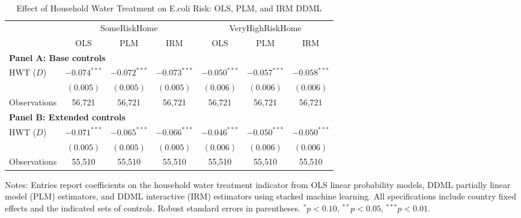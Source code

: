 

\begin{table}[htbp]\centering
\caption{Effect of Household Water Treatment on E.coli Risk: OLS, PLM, and IRM DDML}
\label{tab:benchmark_main}
\begin{tabular}{lcccccc}
\toprule \toprule
& \multicolumn{3}{c}{SomeRiskHome} & \multicolumn{3}{c}{VeryHighRiskHome} \\
\cmidrule(lr){2-4} \cmidrule(lr){5-7}
& OLS & PLM & IRM & OLS & PLM & IRM \\
\midrule
\multicolumn{7}{l}{\textbf{Panel A: Base controls}} \\
\midrule
HWT ($D$) &
$-0.074^{***}$ & $-0.072^{***}$ & $-0.073^{***}$ &
$-0.050^{***}$ & $-0.057^{***}$ & $-0.058^{***}$ \\
& $(0.005)$ & $(0.005)$ & $(0.005)$ & $(0.006)$ & $(0.006)$ & $(0.006)$ \\
Observations &
56{,}721 & 56{,}721 & 56{,}721 & 56{,}721 & 56{,}721 & 56{,}721 \\
\midrule
\multicolumn{7}{l}{\textbf{Panel B: Extended controls}} \\
\midrule
HWT ($D$) &
$-0.071^{***}$ & $-0.065^{***}$ & $-0.066^{***}$ &
$-0.046^{***}$ & $-0.050^{***}$ & $-0.050^{***}$ \\
& $(0.005)$ & $(0.005)$ & $(0.005)$ & $(0.006)$ & $(0.006)$ & $(0.006)$ \\
Observations &
55{,}510 & 55{,}510 & 55{,}510 & 55{,}510 & 55{,}510 & 55{,}510 \\
\bottomrule \bottomrule
\end{tabular}
\begin{flushleft}
\footnotesize
Notes: Entries report coefficients on the household water treatment indicator from OLS linear probability models, DDML partially linear model (PLM) estimators, and DDML interactive (IRM) estimators using stacked machine learning. All specifications include country fixed effects and the indicated sets of controls. Robust standard errors in parentheses. $^{*} p<0.10$, $^{**} p<0.05$, $^{***} p<0.01$.
\end{flushleft}
\end{table}